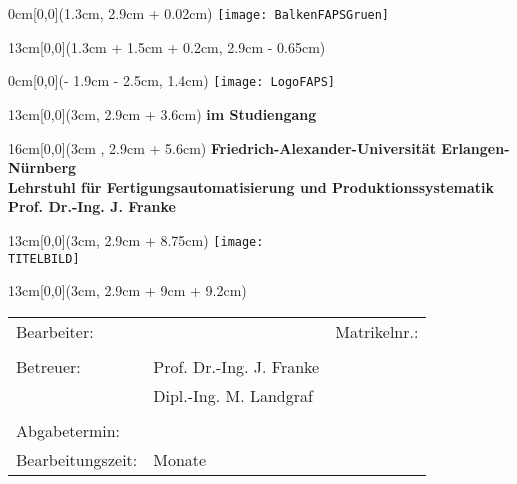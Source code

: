 \newpage
\thispagestyle{empty}



\begin{textblock*}{0cm}[0,0](1.3cm, 2.9cm + 0.02cm)
	\texttt{[image: BalkenFAPSGruen]}
\end{textblock*}

\begin{textblock*}{13cm}[0,0](1.3cm + 1.5cm + 0.2cm, 2.9cm - 0.65cm)
	\singlespacing
	\Large \bfseries \TITEL
\end{textblock*}

\begin{textblock*}{0cm}[0,0](\paperwidth - 1.9cm - 2.5cm, 1.4cm)
	\texttt{[image: LogoFAPS]}
\end{textblock*}

\begin{textblock*}{13cm}[0,0](3cm, 2.9cm + 3.6cm)
	\singlespacing
	\bfseries \ARBEIT\;im Studiengang \STUDIENGANG
\end{textblock*}

\begin{textblock*}{16cm}[0,0](3cm , 2.9cm + 5.6cm)
	\singlespacing
	\bfseries
	Friedrich-Alexander-Universität Erlangen-Nürnberg\\
	Lehrstuhl für Fertigungsautomatisierung und Produktionssystematik\\
	Prof. Dr.-Ing. J. Franke
\end{textblock*}

\begin{textblock*}{13cm}[0,0](3cm, 2.9cm + 8.75cm)
	\texttt{[image: \\TITELBILD]}
\end{textblock*}

\begin{textblock*}{13cm}[0,0](3cm, 2.9cm + 9cm + 9.2cm)
\singlespacing
\begin{table}[h!]
	\begin{tabular}{p{3.5cm}p{7cm}R{4.2cm}}
		Bearbeiter: 	&	\NAME 				& Matrikelnr.: \MATRNR\\
		& & \\
		Betreuer:		&	Prof. Dr.-Ing. J. Franke	& \\ 
					&	Dipl.-Ing. M. Landgraf	& \\
		& & \\
		Abgabetermin: 	&	\ENDE 				& \\
		Bearbeitungszeit:	&	\BEARBEITUNGSZEIT\; Monate &
	\end{tabular}
\end{table}
\end{textblock*}

\mbox{ }

\cleardoublepage



